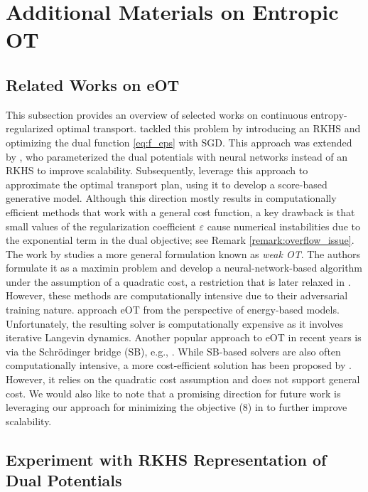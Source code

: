 \documentclass{article}
\theoremstyle{plain}
\theoremstyle{definition}
\theoremstyle{remark}
\begin{document}
\section{Additional Materials on Entropic OT}\label{appendix:densities}


\subsection{Related Works on eOT}\label{subsec:eot_literature}
This subsection provides an overview of selected works on continuous entropy-regularized optimal transport.
\citet{genevay2016stochastic} tackled this problem by introducing an RKHS and optimizing the dual function \eqref{eq:f_eps} with SGD. This approach was extended by \citet{seguy2018large}, who parameterized the dual potentials with neural networks instead of an RKHS to improve scalability. Subsequently, \citet{daniels2021score} leverage this approach to approximate the optimal transport plan, using it to develop a score-based generative model.
Although this direction mostly results in computationally efficient methods that work with a general cost function,
a key drawback is that small values of the regularization coefficient $\varepsilon$ cause numerical instabilities due to the exponential term in the dual objective; see Remark \ref{remark:overflow_issue}.
The work by \citep{korotin2023neural} studies a more general formulation known as \emph{weak OT}. The authors formulate it as a maximin problem and develop a neural-network-based algorithm under the assumption of a quadratic cost, a restriction that is later relaxed in \citep{asadulaev2024neural}. However, these methods are computationally intensive due to their adversarial training nature.
\citet{mokrov2024energyguided} approach eOT from the perspective of energy-based models. Unfortunately, the resulting solver is computationally expensive as it involves iterative Langevin dynamics.
Another popular approach to eOT in recent years is via the Schr\"odinger bridge (SB), e.g., \citep{gushchin2023entropic}. While SB-based solvers are also often computationally intensive, a more cost-efficient solution has been proposed by \citep{korotin2024light}. However, it relies on the quadratic cost assumption and does not support general cost. We would also like to note that a promising direction for future work is leveraging our approach for minimizing the objective (8) in \citep{korotin2024light} to further improve scalability.



\subsection{Experiment with RKHS Representation of Dual Potentials}\label{subsec:eot_rkhs}  
\end{document}
